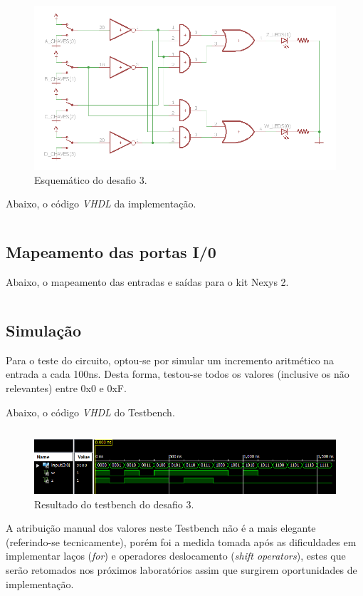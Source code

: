 \documentclass[12pt]{article}
\begin{document}
\clearpage

\begin{figure}[!h]
    \centering
    \includegraphics[width=1\textwidth]{desafio3_sch.png}
    \caption{Esquemático do desafio 3.}
    \label{fig:desafio3_sch}
\end{figure}

Abaixo, o código \emph{VHDL} da implementação.

\inputminted{vhdl}{Desafio3.vhd}

\subsection{Mapeamento das portas I/0}

Abaixo, o mapeamento das entradas e saídas para o kit Nexys 2.

\inputminted{vhdl}{desafio3_pins.ucf}

\subsection{Simulação}

Para o teste do circuito, optou-se por simular um incremento aritmético na entrada a cada 100ns. Desta forma, testou-se todos os valores (inclusive os não relevantes) entre 0x0 e 0xF.

Abaixo, o código \emph{VHDL} do Testbench.

\inputminted{vhdl}{tb_desafio3.vhd}

\begin{figure}[!h]
    \centering
    \includegraphics[width=1\textwidth]{tb_3.PNG}
    \caption{Resultado do testbench do desafio 3.}
    \label{fig:desafio3}
\end{figure}

A atribuição manual dos valores neste Testbench não é a mais elegante (referindo-se tecnicamente), porém foi a medida tomada após as dificuldades em implementar laços (\emph{for}) e operadores deslocamento (\emph{shift operators}), estes que serão retomados nos próximos laboratórios assim que surgirem oportunidades de implementação.
\end{document}
